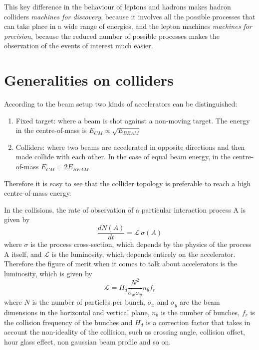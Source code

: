 This key difference in the behaviour of leptons and hadrons makes hadron colliders \textit{machines for discovery}, because it involves all the possible processes that can take place in a wide range of energies, and the lepton machines \textit{machines for precision}, because the reduced number of possible processes makes the observation of the events of interest much easier.

\section{Generalities on colliders}

According to the beam setup two kinds of accelerators can be distinguished: 
\begin{enumerate}
\item Fixed target: where a beam is shot against a non-moving target. The energy in the centre-of-mass is $E_{CM} \propto \sqrt{E_{BEAM}}$
\item Colliders: where two beams are accelerated in opposite directions and then made collide with each other. In the case of equal beam energy, in the centre-of-mass $E_{CM} = 2 E_{BEAM}$
\end{enumerate}
Therefore it is easy to see that the collider topology is preferable to reach a high centre-of-mass energy.

In the collisions, the rate of observation of a particular interaction process A is given by
\begin{equation}
\frac{dN(A)}{dt} = \mathscr{L} \, \sigma(A)
\end{equation}
where $\sigma$ is the process cross-section, which depends by the physics of the process A itself, and $\mathscr{L}$ is the luminosity, which depends entirely on the accelerator.
Therefore the figure of merit when it comes to talk about accelerators is the luminosity, which is given by
\begin{equation}
\mathscr{L} = H_d \frac{N^2}{\sigma_x \sigma_y} n_b f_r
\end{equation}
where $N$ is the number of particles per bunch, $\sigma_x$ and $\sigma_y$ are the beam dimensions in the horizontal and vertical plane, $n_b$ is the number of bunches, $f_r$ is the collision frequency of the bunches and $H_d$ is a correction factor that takes in account the non-ideality of the collision, such as crossing angle, collision offset, hour glass effect, non gaussian beam profile and so on.

